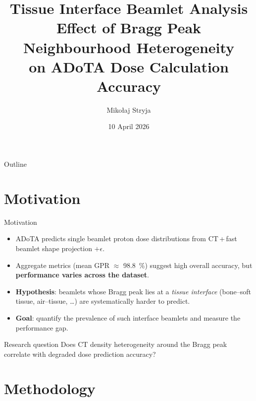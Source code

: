 \documentclass[aspectratio=169, 10pt]{beamer}
\title[ADoTA Tissue Interface Analysis]{Tissue Interface Beamlet Analysis\\[4pt]
{\small Effect of Bragg Peak Neighbourhood Heterogeneity\\on ADoTA Dose Calculation Accuracy}}
\author[M.~Stryja]{Mikołaj Stryja}
\institute{Department of Radiation Science \& Technology}
\date{10 April 2026}
\begin{document}
\begin{frame}[plain]
  \titlepage
\end{frame}

\begin{frame}{Outline}
  \tableofcontents
\end{frame}

\section{Motivation}

\begin{frame}{Motivation}
  \begin{itemize}
    \item ADoTA predicts single beamlet proton dose distributions
          from CT\,+\,fast beamlet shape projection $ + \epsilon$.
    \item Aggregate metrics (mean GPR $\approx$ \SI{98.8}{\percent}) suggest
          high overall accuracy, but \textbf{performance varies across the
          dataset}.
    \item \textbf{Hypothesis}: beamlets whose Bragg peak lies at a
          \emph{tissue interface} (bone--soft tissue, air--tissue, \ldots)
          are systematically harder to predict.
    \item \textbf{Goal}: quantify the prevalence of such interface beamlets
          and measure the performance gap.
  \end{itemize}

  \vspace{6pt}
  \begin{block}{Research question}
    Does CT density heterogeneity around the Bragg peak correlate with
    degraded dose prediction accuracy?
  \end{block}
\end{frame}

\section{Methodology}
\end{document}
